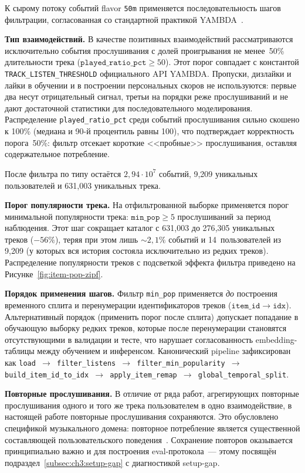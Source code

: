 К сырому потоку событий flavor \texttt{50m} применяется последовательность шагов фильтрации, согласованная со стандартной практикой YAMBDA~\cite{yambda2025}.

\textbf{Тип взаимодействий.} В качестве позитивных взаимодействий рассматриваются исключительно события прослушивания с долей проигрывания не менее~50\% длительности трека ($\mathtt{played\_ratio\_pct} \geq 50$). Этот порог совпадает с константой \texttt{TRACK\_LISTEN\_THRESHOLD} официального API YAMBDA. Пропуски, дизлайки и лайки в обучении и в построении персональных скоров не используются: первые два несут отрицательный сигнал, третьи на порядки реже прослушиваний и не дают достаточной статистики для последовательного моделирования. Распределение \texttt{played\_ratio\_pct} среди событий прослушивания сильно скошено к 100\% (медиана и 90-й процентиль равны 100), что подтверждает корректность порога~50\%: фильтр отсекает короткие <<пробные>> прослушивания, оставляя содержательное потребление.

После фильтра по типу остаётся $2{,}94 \cdot 10^7$ событий, 9{,}209 уникальных пользователей и 631{,}003 уникальных трека.

\textbf{Порог популярности трека.} На отфильтрованной выборке применяется порог минимальной популярности трека: $\mathtt{min\_pop} \geq 5$ прослушиваний за период наблюдения. Этот шаг сокращает каталог с 631{,}003 до 276{,}305 уникальных треков ($-56\%$), теряя при этом лишь $\sim\!2{,}1\%$ событий и 14~пользователей из 9{,}209 (у которых вся история состояла исключительно из редких треков). Распределение популярности треков с подсветкой эффекта фильтра приведено на Рисунке~\ref{fig:item-pop-zipf}.

\textbf{Порядок применения шагов.} Фильтр \texttt{min\_pop} применяется \emph{до} построения временного сплита и перенумерации идентификаторов треков ($\mathtt{item\_id} \to \mathtt{idx}$). Альтернативный порядок (применить порог после сплита) допускает попадание в обучающую выборку редких треков, которые после перенумерации становятся отсутствующими в валидации и тесте, что нарушает согласованность embedding-таблицы между обучением и инференсом. Канонический pipeline зафиксирован как \texttt{load $\to$ filter\_listens $\to$ filter\_min\_popularity $\to$ build\_item\_id\_to\_idx $\to$ apply\_item\_remap $\to$ global\_temporal\_split}.

\textbf{Повторные прослушивания.} В отличие от ряда работ, агрегирующих повторные прослушивания одного и того же трека пользователем в одно взаимодействие, в настоящей работе повторные прослушивания сохраняются. Это обусловлено спецификой музыкального домена: повторное потребление является существенной составляющей пользовательского поведения~\cite{abbattista2024sequential, greer2025beyond}. Сохранение повторов оказывается принципиально важно и для построения eval-протокола~--- этому посвящён подраздел~\ref{subsec:ch3:setup-gap} с диагностикой setup-gap.

